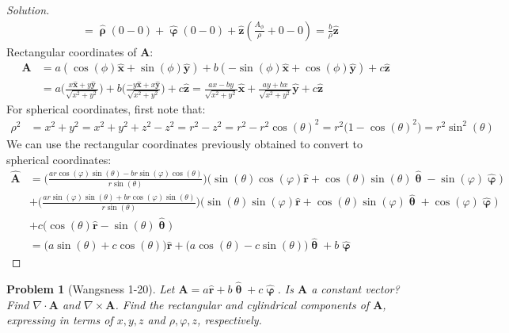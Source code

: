 \documentclass[oneside]{book}
\theoremstyle{mystyle}
\newtheorem{problem}{Problem}[section]
\begin{document}
\begin{proof}[Solution]
\begin{align*}
    &=\hat{\boldsymbol{\uprho}}(0-0)+\hat{\boldsymbol{\upvarphi}}(0-0)+\hat{\mathbf{z}}(\frac{A_\phi}{\rho} +0-0)=\frac{b}{\rho}\hat{\mathbf{z}}
\end{align*}
Rectangular coordinates of $\mathbf{A}$:
\begin{align*}
    \mathbf{A} &= a(\cos(\phi)\hat{\mathbf{x}}+\sin(\phi)\hat{\mathbf{y}})+b(-\sin(\phi)\hat{\mathbf{x}}+\cos(\phi)\hat{\mathbf{y}})+c\hat{\mathbf{z}}\\
    &= a\bigg(\frac{x\hat{\mathbf{x}}+y\hat{\mathbf{y}}}{\sqrt{x^2+y^2}}\bigg)+b\bigg(\frac{-y\hat{\mathbf{x}}+x\hat{\mathbf{y}}}{\sqrt{x^2+y^2}}\bigg)+c\hat{\mathbf{z}}=\frac{ax-by}{\sqrt{x^2+y^2}}\hat{\mathbf{x}}+\frac{ay+bx}{\sqrt{x^2+y^2}}\hat{\mathbf{y}}+c\hat{\mathbf{z}}
\end{align*}
For spherical coordinates, first note that:
\begin{align*}
    \rho^{2}&=x^{2}+y^{2}=x^2+y^2+z^2-z^2=r^2-z^2=r^{2}-r^{2}\cos(\theta)^2=r^2\big(1-\cos(\theta)^2\big)=r^2\sin^2(\theta)
\end{align*}
We can use the rectangular coordinates previously obtained to convert to spherical coordinates:
\begin{align*}
    \hat{\mathbf{A}} &= \bigg(\frac{ar\cos(\varphi)\sin(\theta)-br\sin(\varphi)\cos(\theta)}{r\sin(\theta)}\bigg)\big(\sin(\theta)\cos(\varphi)\hat{\mathbf{r}}+\cos(\theta)\sin(\theta)\hat{\boldsymbol{\uptheta}}-\sin(\varphi)\hat{\boldsymbol{\upvarphi}}\big)\\
    &+\bigg(\frac{ar\sin(\varphi)\sin(\theta)+br\cos(\varphi)\sin(\theta)}{r\sin(\theta)}\bigg)\big(\sin(\theta)\sin(\varphi)\hat{\mathbf{r}}+\cos(\theta)\sin(\varphi)\hat{\boldsymbol{\uptheta}}+\cos(\varphi)\hat{\boldsymbol{\upvarphi}}\big)\\
    &+c\big(\cos(\theta)\hat{\mathbf{r}}-\sin(\theta)\hat{\boldsymbol{\uptheta}}\big)\\
    &= \big(a\sin(\theta)+c\cos(\theta)\big)\hat{\mathbf{r}}+\big(a\cos(\theta)-c\sin(\theta)\big)\hat{\boldsymbol{\uptheta}}+b\hat{\boldsymbol{\upvarphi}}
\end{align*}
\end{proof}
\begin{problem}[Wangsness 1-20]
Let $\mathbf{A} = a\hat{\mathbf{r}} + b\hat{\boldsymbol{\uptheta}}+c\hat{\boldsymbol{\upvarphi}}$. Is $\mathbf{A}$ a constant vector? Find $\nabla\cdot \mathbf{A}$ and $\nabla\times \mathbf{A}$. Find the rectangular and cylindrical components of $\mathbf{A}$, expressing in terms of $x,y,z$ and $\rho,\varphi,z$, respectively.
\end{problem}
\end{document}
